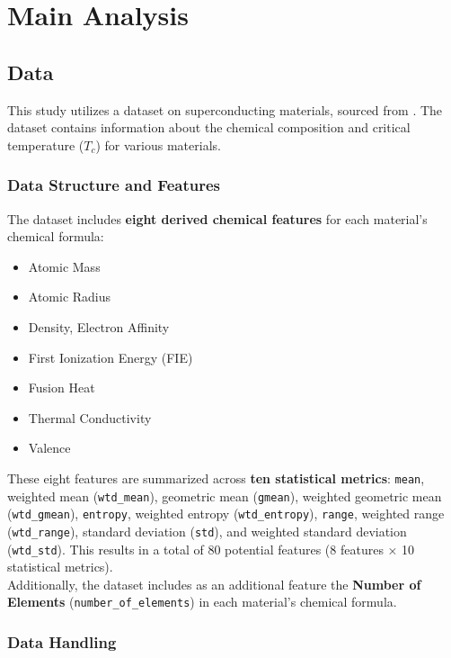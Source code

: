 \documentclass[conference]{IEEEtran}
\begin{document}
\section{\textbf{Main Analysis}}

\subsection{\textbf{Data}}

This study utilizes a dataset on superconducting materials, sourced from \cite{hamidieh2018}. The dataset contains information about the chemical composition and critical temperature ($T_c$) for various materials. \\

\subsubsection{\textbf{Data Structure and Features}}

The dataset includes \textbf{eight derived chemical features} for each material's chemical formula:
\begin{itemize}
\item Atomic Mass
\item Atomic Radius
\item Density, Electron Affinity
\item First Ionization Energy (FIE)
\item Fusion Heat
\item Thermal Conductivity
\item Valence
\end{itemize}

\indent These eight features are summarized across \textbf{ten statistical metrics}: \texttt{mean}, weighted mean (\texttt{wtd\_mean}), geometric mean (\texttt{gmean}), weighted geometric mean (\texttt{wtd\_gmean}), \texttt{entropy}, weighted entropy (\texttt{wtd\_entropy}), \texttt{range}, weighted range (\texttt{wtd\_range}), standard deviation (\texttt{std}), and weighted standard deviation (\texttt{wtd\_std}). This results in a total of 80 potential features (8 features × 10 statistical metrics).\\
\indent Additionally, the dataset includes as an additional feature the \textbf{Number of Elements} (\texttt{number\_of\_elements}) in each material's chemical formula. \\

\subsubsection{\textbf{Data Handling}}
\end{document}
